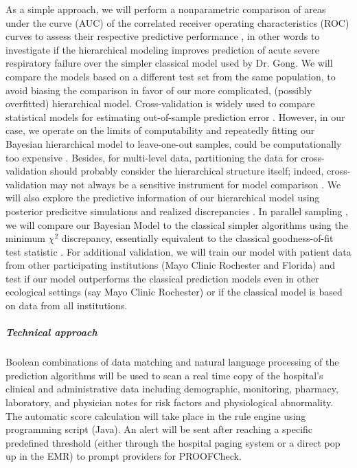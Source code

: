 \documentclass[11pt,notitlepage]{article}
\begin{document}
As a simple approach, we will perform a nonparametric comparison of areas under the curve (AUC) of the correlated receiver operating characteristics (ROC) curves \cite{DeLong_3203132} to assess their respective predictive performance \cite{Newcombe_22890972,Wu_20473190}, in other words to investigate if the hierarchical modeling improves prediction of acute severe respiratory failure over the simpler classical model used by Dr. Gong. We will compare the models based on a different test set from the same population, to avoid biasing the comparison in favor of our more complicated, (possibly overfitted) hierarchical model. Cross-validation is widely used to compare statistical models for estimating out-of-sample prediction error \cite{Vehtari_12396570}. However, in our case, we operate on the limits of computability and repeatedly fitting our Bayesian hierarchical model to leave-one-out samples, could be computationally too expensive \cite{Gelman_Aki_2014predictive}. Besides, for multi-level data, partitioning the data for cross-validation should probably consider the hierarchical structure itself; indeed, cross-validation may not always be a sensitive instrument for model comparison \cite{wang_predictive_2014}. We will also explore the predictive information of our hierarchical model using posterior predicitve simulations and realized discrepancies \cite{Gelman_Aki_2014predictive,Gelman_predictive_2000,GelmanMengStern1996}. In parallel sampling \cite{Congdon_modelcomparison_2005}, we will compare our Bayesian Model to the classical simpler algorithms using the minimum $\chi^{2}$ discrepancy, essentially equivalent to the classical goodness-of-fit test statistic \cite{GelmanMengStern1996}. For additional validation, we will train our model with patient data from other participating institutions (Mayo Clinic Rochester and Florida) and test if our model outperforms the classical prediction models even in other ecological settings (say Mayo Clinic Rochester) or if the classical model is based on data from all institutions.

\subparagraph*{Technical approach}
Boolean combinations of data matching and natural language processing of the prediction algorithms will be used to scan a real time copy of the hospital's clinical and administrative data including demographic, monitoring, pharmacy, laboratory, and physician notes for risk factors and physiological abnormality. The automatic score calculation will take place in the rule engine using programming script (Java). An alert will be sent after reaching a specific predefined threshold (either through the hospital paging system or a direct pop up in the EMR) to prompt providers for PROOFCheck.    
\end{document}
